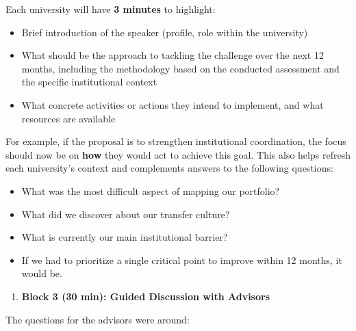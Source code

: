 \documentclass[
  12pt,
  oneside]{book}
\providecommand{\tightlist}{%
  \setlength{\itemsep}{0pt}\setlength{\parskip}{0pt}}
\begin{document}
Each university will have \textbf{3 minutes} to highlight:

\begin{itemize}
\tightlist
\item
  Brief introduction of the speaker (profile, role within the
  university)
\item
  What should be the approach to tackling the challenge over the next 12
  months, including the methodology based on the conducted assessment
  and the specific institutional context
\item
  What concrete activities or actions they intend to implement, and what
  resources are available
\end{itemize}

For example, if the proposal is to strengthen institutional
coordination, the focus should now be on \textbf{how} they would act to
achieve this goal. This also helps refresh each university's context and
complements answers to the following questions:

\begin{itemize}
\tightlist
\item
  What was the most difficult aspect of mapping our portfolio?
\item
  What did we discover about our transfer culture?
\item
  What is currently our main institutional barrier?
\item
  If we had to prioritize a single critical point to improve within 12
  months, it would be.
\end{itemize}

\begin{enumerate}
\def\labelenumi{\arabic{enumi}.}
\setcounter{enumi}{2}
\tightlist
\item
  \textbf{Block 3 (30 min): Guided Discussion with Advisors}
\end{enumerate}

The questions for the advisors were around:
\end{document}
